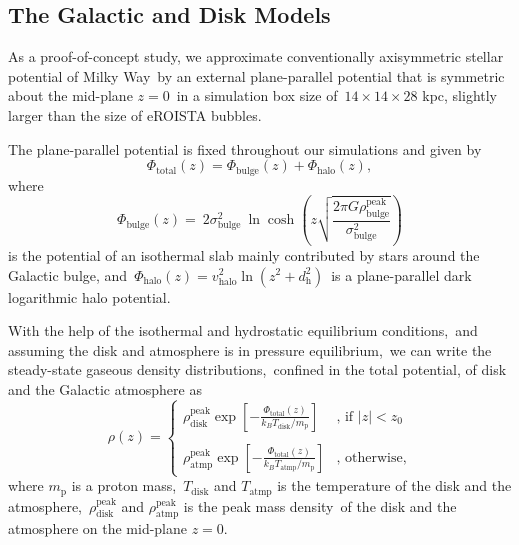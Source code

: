 \documentclass[twocolumn]{aastex631}
\begin{document}
  \subsection{The Galactic and Disk Models}
  As a proof-of-concept study, we approximate conventionally axisymmetric stellar potential of Milky Way\
  by an external plane-parallel potential that is symmetric about the mid-plane $z=0$\
  in a simulation box size of\
  $14\times14\times28$ kpc, slightly larger than the size of eROISTA bubbles.

  The plane-parallel potential is fixed throughout our simulations and given by
  \begin{equation}
    \Phi_{\text{total}}(z) = \Phi_{\text{bulge}}(z) + \Phi_{\text{halo}}(z),
  \end{equation}
  where
  \begin{equation}
    \Phi_{\text{bulge}}(z)=\
    2\sigma^2_{\text{bulge}}\
    \ln\cosh\left(z\sqrt{\frac{2\pi G\rho_{\text{bulge}}^{\text{peak}}}{\sigma^2_{\text{bulge}}}}\right)
  \end{equation}
  is the potential of an isothermal slab mainly contributed by stars around the Galactic bulge, and\
  $\Phi_{\text{halo}}(z)=v^2_{\text{halo}}\ln\left(z^2+d^2_{\text{h}}\right)$\
  is a plane-parallel dark logarithmic halo potential.

  With the help of the isothermal and hydrostatic equilibrium conditions,\
  and assuming the disk and atmosphere is in pressure equilibrium,\
  we can write the steady-state gaseous density distributions,\
  confined in the total potential, of disk and the Galactic atmosphere as\
  \begin{equation}
     \rho(z)=
     \begin{cases}
     \displaystyle\rho_{\text{disk}}^{\text{peak}}
     \exp\left[-\frac{\Phi_{\text{total}}(z)}{k_{B}T_{\text{disk}}/m_{\text{p}}}\right] & \text{, if $|z| < z_{0}$}\\
     \\
     \displaystyle\rho_{\text{atmp}}^{\text{peak}}
     \exp\left[-\frac{\Phi_{\text{total}}(z)}{k_{B}T_{\text{atmp}}/m_{\text{p}}}\right] & \text{, otherwise,}
     \end{cases}
  \end{equation}
  where $m_{\text{p}}$ is a proton mass,\
  $T_{\text{disk}}$ and $T_{\text{atmp}}$ is the temperature of the disk and the atmosphere,\
  $\rho_{\text{disk}}^{\text{peak}}$ and $\rho_{\text{atmp}}^{\text{peak}}$ is the peak mass density\
  of the disk and the atmosphere on the mid-plane $z=0$.
\end{document}

